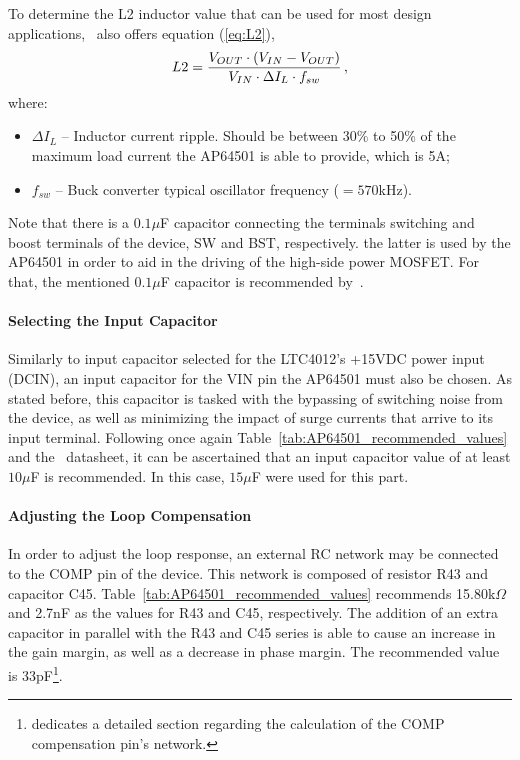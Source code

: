 To determine the L2 inductor value that can be used for most design applications,~\cite{AP64501} also offers equation (\ref{eq:L2}), 
\begin{equation}\label{eq:L2}
	L2 = \frac{V_{OUT} \cdot \left(V_{IN} - V_{OUT}\right)}{V_{IN} \cdot \Delta I_L \cdot f_{sw}}\,,\medskip
\end{equation}
where:
\begin{itemize}
	\item $\Delta I_L$ -- Inductor current ripple. Should be between 30\% to 50\% of the maximum load current the AP64501 is able to provide, which is 5A;
	\item $f_{sw}$ -- Buck converter typical oscillator frequency ($=570$kHz).
\end{itemize}

Note that there is a $0.1 \mu$F capacitor connecting the terminals switching and boost terminals of the device, SW and BST, respectively. the latter is used by the AP64501 in order to aid in the driving of the high-side power MOSFET. For that, the mentioned $0.1 \mu$F capacitor is recommended by~\cite{AP64501}.

\paragraph{Selecting the Input Capacitor}	Similarly to input capacitor selected for the LTC4012's +15VDC power input (DCIN), an input capacitor for the VIN pin the AP64501 must also be chosen. As stated before, this capacitor is tasked with the bypassing of switching noise from the device, as well as minimizing the impact of surge currents that arrive to its input terminal. Following once again Table~\ref{tab:AP64501_recommended_values} and the~\cite{AP64501} datasheet, it can be ascertained that an input capacitor value of at least $10 \mu$F is recommended. In this case, $15 \mu$F were used for this part.

\paragraph{Adjusting the Loop Compensation}	In order to adjust the loop response, an external RC network may be connected to the COMP pin of the device. This network is composed of resistor R43 and capacitor C45. Table~\ref{tab:AP64501_recommended_values} recommends 15.80k$\Omega$ and 2.7nF as the values for R43 and C45, respectively. The addition of an extra capacitor in parallel with the R43 and C45 series is able to cause an increase in the gain margin, as well as a decrease in phase margin. The recommended value is 33pF\footnote[11]{\cite{AP64501} dedicates a detailed section regarding the calculation of the COMP compensation pin's network.}.

